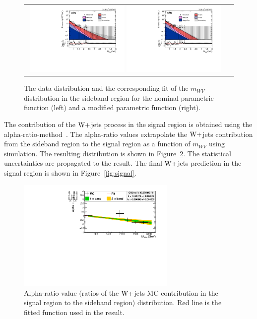 \begin{figure}[!htbp] 
	 \centering 
	 \begin{tabular}{cc}
	 \includegraphics[width=0.48\textwidth]{Plots/BackgroundEstimation/WV/m_lvj_fitting/m_lvj_sb_lo_WJets0_xww__with_pull_log.pdf}
	 \includegraphics[width=0.48\textwidth]{Plots/BackgroundEstimation/WV/m_lvj_fitting/m_lvj_sb_lo_WJets01_xww__with_pull_log.pdf} 
	 \end{tabular}
	 \caption{The data distribution and the corresponding fit of the $m_{WV}$ distribution in the sideband region for the nominal parametric function (left) and a modified parametric function (right).}
	 \label{fig:DataMCForMWW}
\end{figure}

 The contribution of the $\mathrm{W}+$jets process in the signal region is obtained using the alpha-ratio-method~\cite{Gunion1986,resonances,cmsnote}. The alpha-ratio values extrapolate the $\mathrm{W}+$jets contribution from the sideband region to the signal region as a function of $m_{WV}$ using simulation. The resulting distribution is shown in Figure~\ref{fig:AlphaDis}. The statistical uncertainties are propagated to the result. The final $\mathrm{W}+$jets prediction in the signal region is shown in Figure~\ref{fig:signal}. 

\begin{figure}[!htbp] 
	 \centering 
	 \includegraphics[width=0.68\textwidth]{Plots/BackgroundEstimation/WV/WVchannel_AlphaDistribution_AfterFit_New.pdf}
	 \caption{Alpha-ratio value (ratios of the $\mathrm{W}+$jets MC contribution in the signal region to the sideband region) distribution. Red line is the fitted function used in the result.}
	 \label{fig:AlphaDis}
\end{figure}

